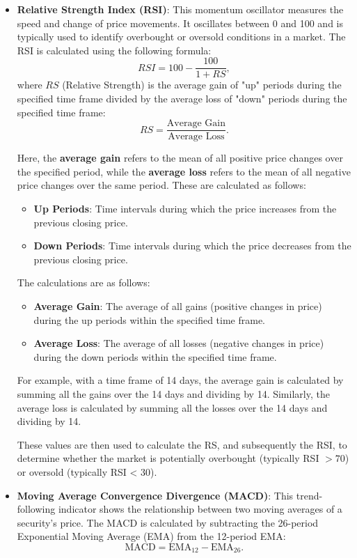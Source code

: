 \begin{itemize}
	\item \textbf{Relative Strength Index (RSI)}: This momentum oscillator measures the speed and change of price movements. It oscillates between 0 and 100 and is typically used to identify overbought or oversold conditions in a market. The RSI is calculated using the following formula:
	      \[
		      RSI = 100 - \frac{100}{1 + RS},
	      \]
	      where \( RS \) (Relative Strength) is the average gain of "up" periods during the specified time frame divided by the average loss of "down" periods during the specified time frame:
	      \[
		      RS = \frac{\text{Average Gain}}{\text{Average Loss}}.
	      \]

	      Here, the \textbf{average gain} refers to the mean of all positive price changes over the specified period, while the \textbf{average loss} refers to the mean of all negative price changes over the same period. These are calculated as follows:
	      \begin{itemize}
		      \item \textbf{Up Periods}: Time intervals during which the price increases from the previous closing price.
		      \item \textbf{Down Periods}: Time intervals during which the price decreases from the previous closing price.
	      \end{itemize}

	      The calculations are as follows:
	      \begin{itemize}
		      \item \textbf{Average Gain}: The average of all gains (positive changes in price) during the up periods within the specified time frame.
		      \item \textbf{Average Loss}: The average of all losses (negative changes in price) during the down periods within the specified time frame.
	      \end{itemize}

	      For example, with a time frame of 14 days, the average gain is calculated by summing all the gains over the 14 days and dividing by 14. Similarly, the average loss is calculated by summing all the losses over the 14 days and dividing by 14.

	      These values are then used to calculate the RS, and subsequently the RSI, to determine whether the market is potentially overbought (typically RSI $> 70$) or oversold (typically RSI < 30).


	\item \textbf{Moving Average Convergence Divergence (MACD)}: This trend-following indicator shows the relationship between two moving averages of a security's price. The MACD is calculated by subtracting the 26-period Exponential Moving Average (EMA) from the 12-period EMA:
	      \[
		      \text{MACD} = \text{EMA}_{12} - \text{EMA}_{26}.
	      \]


\end{itemize}
